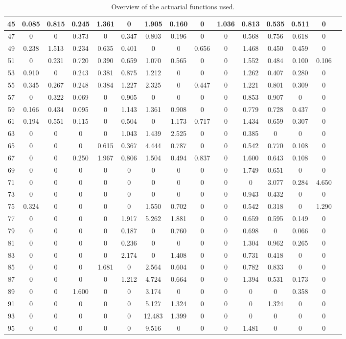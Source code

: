 \begin{table*}[htb]
\begin{tabular}{|c |c |c |c |c |c |c |c |c |c |c |c |c |c |c|}
45&0.085& 0.815& 0.245& 1.361& 0& 1.905& 0.160& 0& 1.036& 0.813& 0.535& 0.511& 0\\\hline
47&0& 0& 0.373& 0& 0.347& 0.803& 0.196& 0& 0& 0.568& 0.756& 0.618& 0\\\hline
49&0.238& 1.513& 0.234& 0.635& 0.401& 0& 0& 0.656& 0& 1.468& 0.450& 0.459& 0\\\hline
51&0& 0.231& 0.720& 0.390& 0.659& 1.070& 0.565& 0& 0& 1.552& 0.484& 0.100& 0.106\\\hline
53&0.910& 0& 0.243& 0.381& 0.875& 1.212& 0& 0& 0& 1.262& 0.407& 0.280& 0\\\hline
55&0.345& 0.267& 0.248& 0.384& 1.227& 2.325& 0& 0.447& 0& 1.221& 0.801& 0.309& 0\\\hline
57&0& 0.322& 0.069& 0& 0.905& 0& 0& 0& 0& 0.853& 0.907& 0& 0\\\hline
59&0.166& 0.434& 0.095& 0& 1.143& 1.361& 0.908& 0& 0& 0.779& 0.728& 0.437& 0\\\hline
61&0.194& 0.551& 0.115& 0& 0.504& 0& 1.173& 0.717& 0& 1.434& 0.659& 0.307& 0\\\hline
63&0& 0& 0& 0& 1.043& 1.439& 2.525& 0& 0& 0.385& 0& 0& 0\\\hline
65&0& 0& 0& 0.615& 0.367& 4.444& 0.787& 0& 0& 0.542& 0.770& 0.108& 0\\\hline
67&0& 0& 0.250& 1.967& 0.806& 1.504& 0.494& 0.837& 0& 1.600& 0.643& 0.108& 0\\\hline
69&0& 0& 0& 0& 0& 0& 0& 0& 0& 1.749& 0.651& 0& 0\\\hline
71&0& 0& 0& 0& 0& 0& 0& 0& 0& 0& 3.077& 0.284& 4.650\\\hline
73&0& 0& 0& 0& 0& 0& 0& 0& 0& 0.943& 0.432& 0& 0\\\hline
75&0.324& 0& 0& 0& 0& 1.550& 0.702& 0& 0& 0.542& 0.318& 0& 1.290\\\hline
77&0& 0& 0& 0& 1.917& 5.262& 1.881& 0& 0& 0.659& 0.595& 0.149& 0\\\hline
79&0& 0& 0& 0& 0.187& 0& 0.760& 0& 0& 0.698& 0& 0.066& 0\\\hline
81&0& 0& 0& 0& 0.236& 0& 0& 0& 0& 1.304& 0.962& 0.265& 0\\\hline
83&0& 0& 0& 0& 2.174& 0& 1.408& 0& 0& 0.731& 0.418& 0& 0\\\hline
85&0& 0& 0& 1.681& 0& 2.564& 0.604& 0& 0& 0.782& 0.833& 0& 0\\\hline
87&0& 0& 0& 0& 1.212& 4.724& 0.664& 0& 0& 1.394& 0.531& 0.173& 0\\\hline
89&0& 0& 1.600& 0& 0& 3.174& 0& 0& 0& 0& 0& 0.358& 0\\\hline
91&0& 0& 0& 0& 0& 5.127& 1.324& 0& 0& 0& 1.324& 0& 0\\\hline
93&0& 0& 0& 0& 0& 12.483& 1.399& 0& 0& 0& 0& 0& 0\\\hline
95&0& 0& 0& 0& 0& 9.516& 0& 0& 0& 1.481& 0& 0& 0\\\hline

    \end{tabular}
    \caption{Overview of the actuarial functions used.}
    \label{table:probabilityItems}
\end{table*}
    

